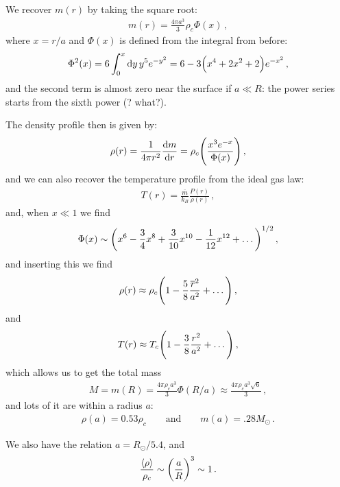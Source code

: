 \documentclass[main.tex]{subfiles}
\begin{document}
We recover \(m(r)\) by taking the square root: 
%
\begin{align}
  m(r) =  \frac{4 \pi a^3}{3} \rho_c \Phi (x)
\,,
\end{align}
%
where \(x = r/a\) and \(\Phi (x)\) is defined from the integral from before: 
%
\begin{align}
  \Phi^2 (x) = 6 \int_{0}^{x} \dd{y} y^{5} e^{-y^2} 
  = 6 - 3 \qty(x^4 +2 x^2+2) e^{-x^2}
\,,
\end{align}
%
and the second term is almost zero near the surface if \(a \ll R\): the power series starts from the sixth power (? what?). 

The density profile then is given by:
%
\begin{align}
  \rho (r) = \frac{1}{4 \pi r^2} \dv{m}{r}
  = \rho_{c} \qty(\frac{x^3 e^{-x}}{\Phi (x)})
\,,
\end{align}
%
and we can also recover the temperature profile from the ideal gas law: 
%
\begin{align}
  T(r) = \frac{\overline{m}}{k_B} \frac{P(r)}{\rho (r)}
\,,
\end{align}
%
and, when \(x \ll 1\) we find 
%
\begin{align}
  \Phi (x) \sim \qty(x^{6} - \frac{3}{4} x^{8} + \frac{3}{10} x^{10} - \frac{1}{12} x^{12}+ \dots)^{1/2}
\,,
\end{align}
%
and inserting this we find 
%
\begin{align}
  \rho (r) \approx \rho _c \qty(1 - \frac{5}{8} \frac{\overline{r}^2}{a^2} + \dots)
\,,
\end{align}
%
and 
%
\begin{align}
  T(r) \approx T_c \qty( 1 - \frac{3}{8} \frac{r^2}{a^2} + \dots)
\,,
\end{align}
%
which allows us to get the total mass 
%
\begin{align}
  M = m(R) = \frac{4 \pi \rho_c a^3}{3} \Phi (R/a) \approx
  \frac{4 \pi \rho _c a^3 \sqrt{6}}{3} 
\,,
\end{align}
%
and lots of it are within a radius \(a\): 
%
\begin{align}
  \rho (a) = 0.53 \rho _c
  \qquad
  \text{and}
  \qquad
  m(a) = \num{.28} M_{\odot}
\,.
\end{align}
%

We also have the relation \(a = R_{\odot} / 5.4\), and 
%
\begin{align}
  \frac{\expval{\rho }}{\rho _c } \sim \qty(\frac{a}{R})^3 
  \sim 1
\,.
\end{align}
%
\end{document}
